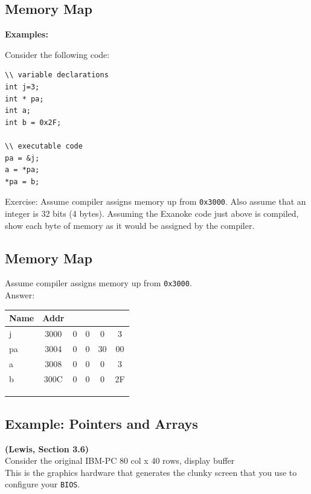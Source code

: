 \documentclass{article}	%
\begin{document}
\subsection{Memory Map}
\noindent
{\bf Examples: }

Consider the following code:
\begin{verbatim}
\\ variable declarations
int j=3;
int * pa;
int a;
int b = 0x2F;

\\ executable code
pa = &j;
a = *pa;
*pa = b;
\end{verbatim}

Exercise: Assume compiler assigns memory up from {\tt 0x3000}.
Also assume that an integer is 32 bits (4 bytes). Assuming the Exanoke code just above
is compiled, show each byte of memory as it would be assigned
by the compiler.


\subsection{Memory Map}
Assume compiler assigns memory up from {\tt 0x3000}. \\

Answer:
\vspace{0.4in}
\begin{tabular}{|l|c|c|c|c|c|}
\hline
Name &Addr & & & & \\ \hline
 j   & 3000 &0 &0 &0  &3 \\ \hline
 pa  & 3004 &0 &0 &30 &00 \\ \hline
 a   & 3008 &0 &0 &0 &3 \\ \hline
 b   & 300C &0 &0 &0 &2F \\ \hline
     & & & & & \\ \hline
     & & & & & \\ \hline
     & & & & & \\ \hline
\end{tabular}


\subsection{Example: Pointers and Arrays}
{\bf (Lewis, Section 3.6)}\\
Consider the original IBM-PC
80 col x 40 rows, display buffer \\

 This is the graphics hardware that generates	%
the clunky screen that you use to configure
your {\tt BIOS}.
\end{document}
